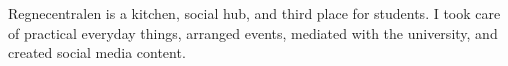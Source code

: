 
Regnecentralen is a kitchen, social hub, and third place for students. I took care of practical
everyday things, arranged events, mediated with the university, and created social media content.
